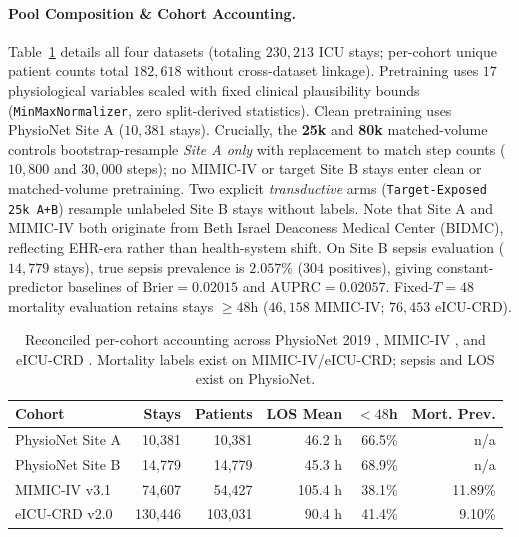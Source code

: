\documentclass[10pt,twocolumn]{article}
\begin{document}
\paragraph{Pool Composition \& Cohort Accounting.}
Table~\ref{tab:cohort} details all four datasets (totaling $230{,}213$ ICU stays; per-cohort unique patient counts total $182{,}618$ without cross-dataset linkage). Pretraining uses $17$ physiological variables scaled with fixed clinical plausibility bounds (\texttt{MinMaxNormalizer}, zero split-derived statistics). Clean pretraining uses PhysioNet Site A ($10{,}381$ stays). Crucially, the \textbf{25k} and \textbf{80k} matched-volume controls bootstrap-resample \emph{Site A only} with replacement to match step counts ($10{,}800$ and $30{,}000$ steps); no MIMIC-IV or target Site B stays enter clean or matched-volume pretraining. Two explicit \textit{transductive} arms (\texttt{Target-Exposed 25k A+B}) resample unlabeled Site B stays without labels. Note that Site A and MIMIC-IV both originate from Beth Israel Deaconess Medical Center (BIDMC), reflecting EHR-era rather than health-system shift. On Site B sepsis evaluation ($14{,}779$ stays), true sepsis prevalence is $2.057\%$ ($304$ positives), giving constant-predictor baselines of $\mathrm{Brier} = 0.02015$ and $\mathrm{AUPRC} = 0.02057$. Fixed-$T=48$ mortality evaluation retains stays $\ge 48\text{h}$ ($46{,}158$ MIMIC-IV; $76{,}453$ eICU-CRD).

\begin{table}[t]
\centering
\caption{Reconciled per-cohort accounting across PhysioNet 2019 \cite{reyna2019early}, MIMIC-IV \cite{johnson2023mimic}, and eICU-CRD \cite{pollard2018eicu}. Mortality labels exist on MIMIC-IV/eICU-CRD; sepsis and LOS exist on PhysioNet.}
\label{tab:cohort}
\scriptsize
\begin{tabular}{lrrrrr}
\toprule
Cohort & Stays & Patients & LOS Mean & $<48$h & Mort. Prev. \\
\midrule
PhysioNet Site A & 10,381 & 10,381 & 46.2 h & 66.5\% & n/a \\
PhysioNet Site B & 14,779 & 14,779 & 45.3 h & 68.9\% & n/a \\
MIMIC-IV v3.1 & 74,607 & 54,427 & 105.4 h & 38.1\% & 11.89\% \\
eICU-CRD v2.0 & 130,446 & 103,031 & 90.4 h & 41.4\% & 9.10\% \\
\bottomrule
\end{tabular}
\end{table}
\end{document}
